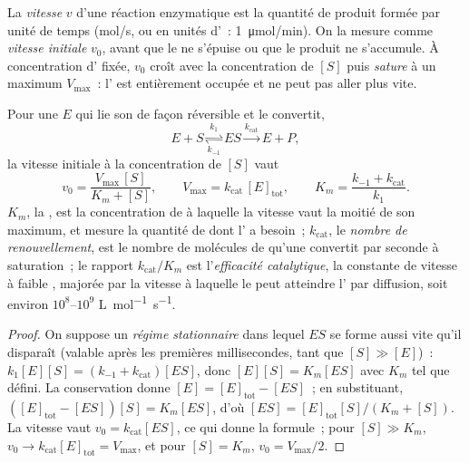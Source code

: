 \begin{definition}\label{def:b1:enzymes:rate}
La \emph{vitesse} $v$ d'une réaction
enzymatique est la quantité de produit formée par unité de temps
(\unit{mol/s}, ou en unités d'~: \qty{1}{\micro mol/min}). On la
mesure comme \emph{vitesse initiale} $v_0$, avant que le  ne
s'épuise ou que le produit ne s'accumule. À concentration d'
fixée, $v_0$ croît avec la concentration de  $[S]$ puis
\emph{sature} à un maximum $V_{\max}$~: l' est entièrement occupée
et ne peut pas aller plus vite.
\end{definition}

\begin{theorem}\label{thm:b1:enzymes:mm}
Pour une  $E$ qui lie son  de façon réversible et le
convertit,
\[
E + S \underset{k_{-1}}{\overset{k_1}{\rightleftharpoons}} ES
\overset{k_{\text{cat}}}{\longrightarrow} E + P ,
\]
la vitesse initiale à la concentration de  $[S]$ vaut
\[
v_0 = \frac{V_{\max}\,[S]}{K_m + [S]}, \qquad V_{\max} = k_{\text{cat}}\,[E]_{\text{tot}},
\qquad K_m = \frac{k_{-1} + k_{\text{cat}}}{k_1} .
\]
$K_m$, la \emph{}, est la concentration de
 à laquelle la vitesse vaut la moitié de son maximum, et mesure
la quantité de  dont l' a besoin~; $k_{\text{cat}}$, le
\emph{nombre de renouvellement}, est le
nombre de molécules de  qu'une  convertit par seconde à
saturation~; le rapport $k_{\text{cat}}/K_m$ est l'\emph{efficacité
catalytique}, la constante de vitesse à faible , majorée par la
vitesse à laquelle le  peut atteindre l' par diffusion,
soit environ $10^8$--$10^9$ \unit{L.mol^{-1}.s^{-1}}.
\end{theorem}
\begin{proof}
On suppose un \emph{régime stationnaire} dans lequel $ES$ se forme aussi
vite qu'il disparaît (valable après les premières millisecondes, tant
que $[S] \gg [E]$)~:
$k_1[E][S] = (k_{-1} + k_{\text{cat}})[ES]$, donc $[E][S] = K_m[ES]$
avec $K_m$ tel que défini. La conservation donne $[E] = [E]_{\text{tot}} -
[ES]$~; en substituant, $([E]_{\text{tot}} - [ES])[S] = K_m[ES]$, d'où
$[ES] = [E]_{\text{tot}}[S]/(K_m + [S])$. La vitesse vaut
$v_0 = k_{\text{cat}}[ES]$, ce qui donne la formule~; pour $[S] \gg K_m$,
$v_0 \to k_{\text{cat}}[E]_{\text{tot}} = V_{\max}$, et pour $[S] = K_m$,
$v_0 = V_{\max}/2$.
\end{proof}

